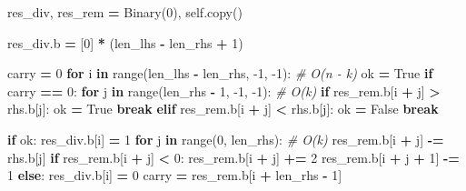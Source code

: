 \documentclass[
]{article}
\newenvironment{Shaded}{\begin{snugshade}}{\end{snugshade}}
\newcommand{\BuiltInTok}[1]{#1}
\newcommand{\CommentTok}[1]{\textcolor[rgb]{0.56,0.35,0.01}{\textit{#1}}}
\newcommand{\ControlFlowTok}[1]{\textcolor[rgb]{0.13,0.29,0.53}{\textbf{#1}}}
\newcommand{\DecValTok}[1]{\textcolor[rgb]{0.00,0.00,0.81}{#1}}
\newcommand{\KeywordTok}[1]{\textcolor[rgb]{0.13,0.29,0.53}{\textbf{#1}}}
\newcommand{\NormalTok}[1]{#1}
\newcommand{\OperatorTok}[1]{\textcolor[rgb]{0.81,0.36,0.00}{\textbf{#1}}}
\newcommand{\VariableTok}[1]{\textcolor[rgb]{0.00,0.00,0.00}{#1}}
\begin{document}
\begin{Shaded}
\begin{Highlighting}[]
{\NormalTok{        res_div, res_rem }\OperatorTok{=}\NormalTok{ Binary(}\DecValTok{0}\NormalTok{), }\VariableTok{self}\NormalTok{.copy()}
  
\NormalTok{        res_div.b }\OperatorTok{=}\NormalTok{ [}\DecValTok{0}\NormalTok{] }\OperatorTok{*}\NormalTok{ (len_lhs }\OperatorTok{-}\NormalTok{ len_rhs }\OperatorTok{+} \DecValTok{1}\NormalTok{)}
  
\NormalTok{        carry }\OperatorTok{=} \DecValTok{0}
        \ControlFlowTok{for}\NormalTok{ i }\KeywordTok{in} \BuiltInTok{range}\NormalTok{(len_lhs }\OperatorTok{-}\NormalTok{ len_rhs, }\DecValTok{-1}\NormalTok{, }\DecValTok{-1}\NormalTok{):  }\CommentTok{# O(n - k)}
\NormalTok{            ok }\OperatorTok{=} \VariableTok{True}
            \ControlFlowTok{if}\NormalTok{ carry }\OperatorTok{==} \DecValTok{0}\NormalTok{:}
                \ControlFlowTok{for}\NormalTok{ j }\KeywordTok{in} \BuiltInTok{range}\NormalTok{(len_rhs }\OperatorTok{-} \DecValTok{1}\NormalTok{, }\DecValTok{-1}\NormalTok{, }\DecValTok{-1}\NormalTok{):  }\CommentTok{# O(k)}
                    \ControlFlowTok{if}\NormalTok{ res_rem.b[i }\OperatorTok{+}\NormalTok{ j] }\OperatorTok{>}\NormalTok{ rhs.b[j]:}
\NormalTok{                        ok }\OperatorTok{=} \VariableTok{True}
                        \ControlFlowTok{break}
                    \ControlFlowTok{elif}\NormalTok{ res_rem.b[i }\OperatorTok{+}\NormalTok{ j] }\OperatorTok{<}\NormalTok{ rhs.b[j]:}
\NormalTok{                        ok }\OperatorTok{=} \VariableTok{False}
                        \ControlFlowTok{break}
  
            \ControlFlowTok{if}\NormalTok{ ok:}
\NormalTok{                res_div.b[i] }\OperatorTok{=} \DecValTok{1}
                \ControlFlowTok{for}\NormalTok{ j }\KeywordTok{in} \BuiltInTok{range}\NormalTok{(}\DecValTok{0}\NormalTok{, len_rhs):  }\CommentTok{# O(k)}
\NormalTok{                    res_rem.b[i }\OperatorTok{+}\NormalTok{ j] }\OperatorTok{-=}\NormalTok{ rhs.b[j]}
                    \ControlFlowTok{if}\NormalTok{ res_rem.b[i }\OperatorTok{+}\NormalTok{ j] }\OperatorTok{<} \DecValTok{0}\NormalTok{:}
\NormalTok{                        res_rem.b[i }\OperatorTok{+}\NormalTok{ j] }\OperatorTok{+=} \DecValTok{2}
\NormalTok{                        res_rem.b[i }\OperatorTok{+}\NormalTok{ j }\OperatorTok{+} \DecValTok{1}\NormalTok{] }\OperatorTok{-=} \DecValTok{1}
            \ControlFlowTok{else}\NormalTok{:}
\NormalTok{                res_div.b[i] }\OperatorTok{=} \DecValTok{0}
\NormalTok{            carry }\OperatorTok{=}\NormalTok{ res_rem.b[i }\OperatorTok{+}\NormalTok{ len_rhs }\OperatorTok{-} \DecValTok{1}\NormalTok{]}
  
}
\end{Highlighting}
\end{Shaded}
\end{document}
